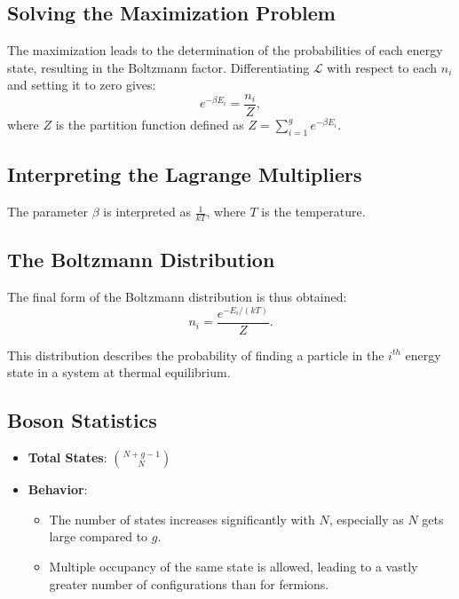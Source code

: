 \documentclass[12pt]{article}
\begin{document}
\subsection{Solving the Maximization Problem}
The maximization leads to the determination of the probabilities of each energy state, resulting in the Boltzmann factor. Differentiating $\mathcal{L}$ with respect to each $n_i$ and setting it to zero gives:
\begin{equation*}
    e^{-\beta E_i} = \frac{n_i}{Z},
\end{equation*}
where $Z$ is the partition function defined as $Z = \sum_{i=1}^{g} e^{-\beta E_i}$.

\subsection{Interpreting the Lagrange Multipliers}
The parameter $\beta$ is interpreted as $\frac{1}{kT}$, where $T$ is the temperature.

\subsection{The Boltzmann Distribution}
The final form of the Boltzmann distribution is thus obtained:
\begin{equation*}
    n_i = \frac{e^{-E_i/(kT)}}{Z}.
\end{equation*}

This distribution describes the probability of finding a particle in the $i^{th}$ energy state in a system at thermal equilibrium.

\subsection{ Boson Statistics}
\begin{itemize}
    \item \textbf{Total States}: $\binom{N + g - 1}{N}$
    \item \textbf{Behavior}:
    \begin{itemize}
        \item The number of states increases significantly with $N$, especially as $N$ gets large compared to $g$.
        \item Multiple occupancy of the same state is allowed, leading to a vastly greater number of configurations than for fermions.
    \end{itemize}
\end{itemize}
\end{document}
